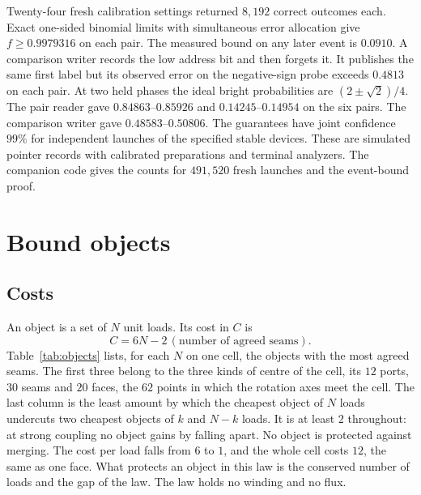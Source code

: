 \documentclass[11pt]{article}
\theoremstyle{definition}
\theoremstyle{remark}
\theoremstyle{plain}
\begin{document}
Twenty-four fresh calibration settings returned $8{,}192$ correct
outcomes each. Exact one-sided binomial limits with simultaneous error
allocation give $f\geq0.9979316$ on each pair. The measured bound on any
later event is $0.0910$. A comparison writer records the low address bit
and then forgets it. It publishes the same first label but its observed
error on the negative-sign probe exceeds $0.4813$ on each pair. At two
held phases the ideal bright probabilities are $(2\pm\sqrt2)/4$.
The pair reader gave $0.84863$--$0.85926$ and $0.14245$--$0.14954$ on
the six pairs. The comparison writer gave $0.48583$--$0.50806$.
The guarantees have joint confidence $99\%$ for independent launches of
the specified stable devices. These are simulated pointer records with
calibrated preparations and terminal analyzers. The companion code gives
the counts for $491{,}520$ fresh launches and the event-bound proof.

\section{Bound objects}
\label{sec:objects}

\subsection{Costs}

An object is a set of $N$ unit loads. Its cost in $C$ is
\begin{equation}
C=6N-2\,(\text{number of agreed seams}).
\label{eq:cost}
\end{equation}
Table~\ref{tab:objects} lists, for each $N$ on one cell, the objects with
the most agreed seams. The first three belong to the three kinds of centre
of the cell, its $12$ ports, $30$ seams and $20$ faces, the $62$ points in
which the rotation axes meet the cell. The last column is the least amount
by which the cheapest object of $N$ loads undercuts two cheapest objects of
$k$ and $N-k$ loads. It is at least $2$ throughout: at strong coupling no
object gains by falling apart. No object is protected against merging. The
cost per load falls from $6$ to $1$, and the whole cell costs $12$, the
same as one face. What protects an object in this law is the conserved
number of loads and the gap of the law. The law holds no winding and no
flux.
\end{document}
